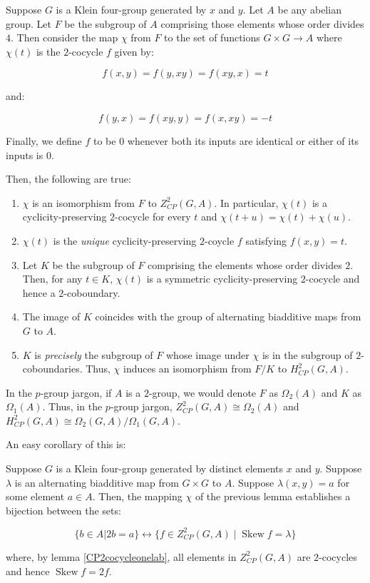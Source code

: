 \documentclass[10pt]{amsart}
\newcommand{\Skew}{\operatorname{Skew}}
\begin{document}
\begin{lemma}\label{KleinfourCPcocycleclassification}
  Suppose $G$ is a Klein four-group generated by $x$ and $y$. Let $A$
  be any abelian group. Let $F$ be the subgroup of $A$ comprising
  those elements whose order divides $4$. Then consider the map $\chi$
  from $F$ to the set of functions $G \times G \to A$ where $\chi(t)$
  is the $2$-cocycle $f$ given by:

  $$f(x,y) = f(y,xy) = f(xy,x) = t$$

  and:

  $$f(y,x) = f(xy,y) = f(x,xy) = -t$$

  Finally, we define $f$ to be $0$ whenever both its inputs are
  identical or either of its inputs is $0$.

  Then, the following are true:

  \begin{enumerate}
  \item $\chi$ is an isomorphism from $F$ to $Z^2_{CP}(G,A)$. In
    particular, $\chi(t)$ is a cyclicity-preserving $2$-cocycle for
    every $t$ and $\chi(t + u) = \chi(t) + \chi(u)$.
  \item $\chi(t)$ is the {\em unique} cyclicity-preserving $2$-coycle
    $f$ satisfying $f(x,y) = t$.
  \item Let $K$ be the subgroup of $F$ comprising the elements whose
    order divides $2$. Then, for any $t \in K$, $\chi(t)$ is a
    symmetric cyclicity-preserving $2$-cocycle and hence a
    $2$-coboundary.
  \item The image of $K$ coincides with the group of alternating
    biadditive maps from $G$ to $A$.
  \item $K$ is {\em precisely} the subgroup of $F$ whose image under
    $\chi$ is in the subgroup of $2$-coboundaries. Thus, $\chi$
    induces an isomorphism from $F/K$ to $H^2_{CP}(G,A)$.
  \end{enumerate}

  In the $p$-group jargon, if $A$ is a $2$-group, we would denote $F$
  as $\Omega_2(A)$ and $K$ as $\Omega_1(A)$. Thus, in the $p$-group
  jargon, $Z^2_{CP}(G,A) \cong \Omega_2(A)$ and $H^2_{CP}(G,A) \cong
  \Omega_2(G,A)/\Omega_1(G,A)$.
\end{lemma}

An easy corollary of this is:

\begin{lemma}
  Suppose $G$ is a Klein four-group generated by distinct elements $x$
  and $y$. Suppose $\lambda$ is an alternating biadditive map from $G
  \times G$ to $A$. Suppose $\lambda(x,y) = a$ for some element $a \in
  A$. Then, the mapping $\chi$ of the previous lemma establishes a
  bijection between the sets:

  $$\{ b \in A | 2b = a \} \leftrightarrow \{ f \in Z^2_{CP}(G,A) \mid \Skew f = \lambda \}$$

  where, by lemma \ref{CP2cocycleonelab}, all elements in
  $Z^2_{CP}(G,A)$ are $2$-cocycles and hence $\Skew f = 2f$.
\end{lemma}
\end{document}
